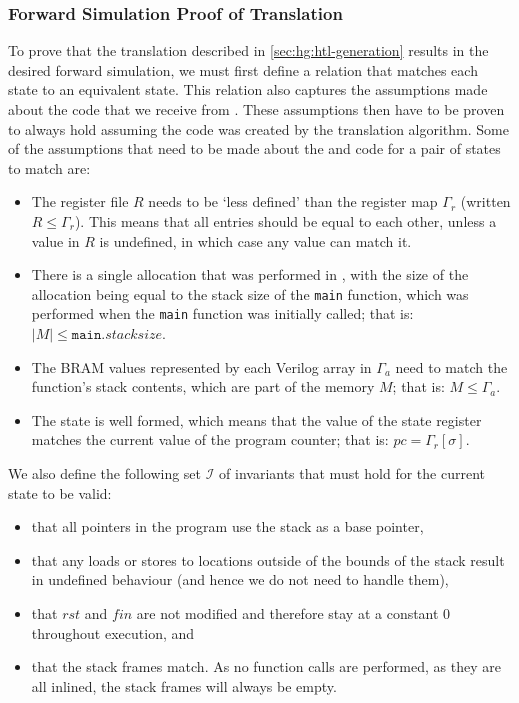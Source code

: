 \subsubsection{Forward Simulation Proof of Translation}

To prove that the translation described in \cref{sec:hg:htl-generation} results
in the desired forward simulation, we must first define a relation that matches
each \rtlsubpar{} state to an equivalent \htl{} state.  This relation also
captures the assumptions made about the \rtlsubpar{} code that we receive from
\compcert{}.  These assumptions then have to be proven to always hold assuming
the \htl{} code was created by the translation algorithm.  Some of the
assumptions that need to be made about the \rtlsubpar{} and \htl{} code for a
pair of states to match are:

\begin{itemize}
\item The \rtlsubpar{} register file $R$ needs to be `less defined' than the \htl{} register
  map $\Gamma_{r}$ (written $R \le \Gamma_{r}$). This means that all entries
  should be equal to each other, unless a value in $R$ is undefined, in which
  case any value can match it.
\item There is a single allocation that was performed in \rtlsubpar{}, with the
  size of the allocation being equal to the stack size of the \texttt{main}
  function, which was performed when the \texttt{main} function was initially
  called; that is: $|M| \le \mathtt{main}.\mathit{stacksize}$.
\item The \gls{BRAM} values represented by each Verilog array in $\Gamma_{a}$ need to
  match the \rtlsubpar{} function's stack contents, which are part of the memory $M$;
  that is: $M \le \Gamma_{a}$.
\item The state is well formed, which means that the value of the state register
  matches the current value of the program counter; that is:
  $\mathit{pc} = \Gamma_{r}[\sigma]$.
\end{itemize}

We also define the following set $\mathcal{I}$ of invariants that must hold for
the current state to be valid:

\begin{itemize}
\item that all pointers in the program use the stack as a base pointer,
\item that any loads or stores to locations outside of the bounds of the stack
  result in undefined behaviour (and hence we do not need to handle them),
\item that $\mathit{rst}$ and $\mathit{fin}$ are not modified and therefore stay
  at a constant 0 throughout execution, and
\item that the stack frames match.  As no function calls are performed, as they
  are all inlined, the stack frames will always be empty.
\end{itemize}

